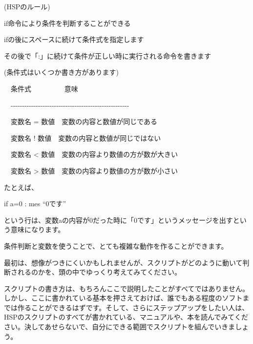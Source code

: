 \begin{description}
    \item (HSPのルール)
\end{description}

\begin{description}
    \item if命令により条件を判断することができる
    \item ifの後にスペースに続けて条件式を指定します
    \item その後で「:」に続けて条件が正しい時に実行される命令を書きます
\end{description}

\begin{description}
    \item (条件式はいくつか書き方があります)
\end{description}

\begin{description}
    \item \ \ 条件式 \ \ \ \ \ \ \ \ \ 意味
    \item \ \ {}-{}-{}-{}-{}-{}-{}-{}-{}-{}-{}-{}-{}-{}-{}-{}-{}-{}-{}-{}-{}-{}-{}-{}-{}-{}-{}-{}-{}-{}-{}-{}-{}-{}-{}-{}-{}-{}-{}-{}-{}-{}-{}-{}-{}-{}-{}-{}-{}-{}-{}-{}-
    \item \ \ 変数名 = 数値\ \ 変数の内容と数値が同じである
    \item \ \ 変数名 ! 数値\ \ 変数の内容と数値が同じではない
    \item \ \ 変数名 {\textless} 数値\ \ 変数の内容より数値の方が数が大きい
    \item \ \ 変数名 {\textgreater} 数値\ \ 変数の内容より数値の方が数が小さい
\end{description}

たとえば、

\begin{description}
    \item if a=0 : mes “0です”
\end{description}

という行は、変数aの内容が0だった時に「0です」というメッセージを出すという意味になります。

条件判断と変数を使うことで、とても複雑な動作を作ることができます。

最初は、想像がつきにくいかもしれませんが、スクリプトがどのように動いて判断されるのかを、頭の中でゆっくり考えてみてください。

スクリプトの書き方は、もちろんここで説明したことがすべてではありません。しかし、ここに書かれている基本を押さえておけば、誰でもある程度のソフトまでは作ることができるはずです。そして、さらにステップアップをしたい人は、HSPのスクリプトのすべてが書かれている、マニュアルや、本を読んでみてください。決してあせらないで、自分にできる範囲でスクリプトを組んでいきましょう。

